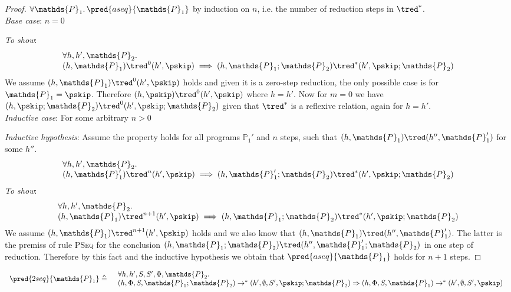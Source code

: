 {\parindent0pt
\begin{proof}
$\forall \mathds{P}_1 \ldotp \pred{aseq}{\mathds{P}_1}$ by induction on $n$, i.e. the number of reduction steps in $\tred^*$. \\

\textit{Base case}: $n = 0$

\textit{To show}: 
\[
\begin{array}{l}
\forall h, h', \mathds{P}_2 \ldotp \\
(h, \mathds{P}_1) \tred^0 (h', \pskip) \implies 
(h, \mathds{P}_1; \mathds{P}_2) \tred^* (h', \pskip; \mathds{P}_2)
\end{array}
\]
We assume $(h, \mathds{P}_1) \tred^0 (h', \pskip)$ holds and given it is a zero-step reduction, the only possible case is for $\mathds{P}_1 = \pskip$. Therefore $(h, \pskip) \tred^0 (h', \pskip)$ where $h = h'$. Now for $m = 0$ we have $(h, \pskip; \mathds{P}_2) \tred^0 (h', \pskip; \mathds{P}_2)$ given that $\tred^*$ is a reflexive relation, again for $h = h'$. \\

\textit{Inductive case}: For some arbitrary $n > 0$

\textit{Inductive hypothesis}: Assume the property holds for all programs $\mathds{P}_1'$ and $n$ steps, such that $(h, \mathds{P}_1) \tred (h'', \mathds{P}_1')$ for some $h''$.
\[
\begin{array}{l}
\forall h, h', \mathds{P}_2 \ldotp \\
(h, \mathds{P}_1') \tred^n (h', \pskip) \implies 
(h, \mathds{P}_1'; \mathds{P}_2) \tred^* (h', \pskip; \mathds{P}_2)
\end{array}
\]
\textit{To show}:
\[
\begin{array}{l}
\forall h, h', \mathds{P}_2 \ldotp \\
(h, \mathds{P}_1) \tred^{n+1} (h', \pskip) \implies 
(h, \mathds{P}_1; \mathds{P}_2) \tred^* (h', \pskip; \mathds{P}_2)
\end{array}
\]
We assume $(h, \mathds{P}_1) \tred^{n+1} (h', \pskip)$ holds and we also know that $(h, \mathds{P}_1) \tred (h'', \mathds{P}_1')$. The latter is the premiss of rule \textsc{PSeq} for the conclusion $(h, \mathds{P}_1; \mathds{P}_2) \tred (h'', \mathds{P}_1'; \mathds{P}_2)$ in one step of reduction. Therefore by this fact and the inductive hypothesis we obtain that $\pred{aseq}{\mathds{P}_1}$ holds for $n + 1$ steps.

\end{proof}
}

\lem \label{ref:2seq}
\[
\begin{array}{r l}
	\pred{2seq}{\mathds{P}_1} \triangleq
	&
	\begin{array}{l}
	\forall h, h', S, S', \Phi, \mathds{P}_2 \ldotp \\ 
	(h, \Phi, S, \mathds{P}_1; \mathds{P}_2) \rightarrow^* (h', \emptyset, S', \pskip; \mathds{P}_2)
	\Rightarrow
	(h, \Phi, S, \mathds{P}_1) \rightarrow^* (h', \emptyset, S', \pskip)
	\end{array}
\end{array}
\]

